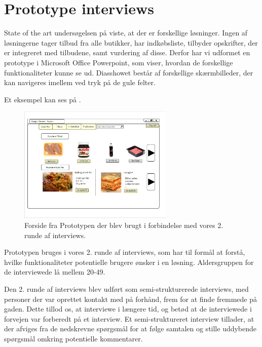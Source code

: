 \section{Prototype interviews}\label{section:interview2}
State of the art undersøgelsen på  viste, at der er forskellige løsninger.
Ingen af løsningerne tager tilbud fra alle butikker, har indkøbsliste, tilbyder opskrifter, der er integreret med tilbudene, samt vurdering af disse.
Derfor har vi udformet en prototype i Microsoft Office Powerpoint, som viser, hvordan de forskellige funktionaliteter kunne se ud.
Diasshowet består af forskellige skærmbilleder, der kan navigeres imellem ved tryk på de gule felter.

Et eksempel kan ses på .

\begin{figure}
\vspace{-20pt}
	\begin{center}
		\includegraphics[width=0.66\textwidth]{images/Images/prototype-forside.PNG}
	\end{center}
	\vspace{-20pt}
	\caption{Forside fra Prototypen der blev brugt i forbindelse med vores 2. runde af interviews.}\label{ss:Prototype}
	\vspace{-20pt}
\end{figure}

Prototypen bruges i vores 2. runde af interviews, som har til formål at forstå, hvilke funktionaliteter potentielle brugere ønsker i en løsning.
Aldersgruppen for de interviewede lå mellem 20-49.

Den 2. runde af interviews blev udført som semi-strukturerede interviews, med personer der var oprettet kontakt med på forhånd, frem for at finde fremmede på gaden.
Dette tillod os, at interviewe i længere tid, og betød at de interviewede i forvejen var forberedt på et interview.
Et semi-struktureret interview tillader, at der afviges fra de nedskrevne spørgsmål for at følge samtalen og stille uddybende spørgsmål omkring potentielle kommentarer.\cite[s. 142-146]{DIS2014}
 
